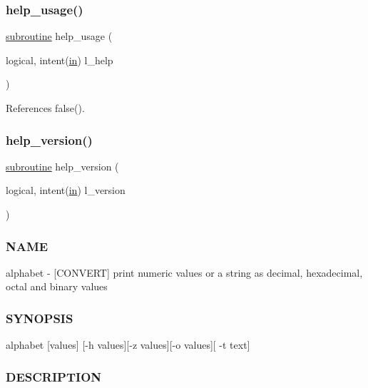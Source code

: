 \subsubsection{\texorpdfstring{help\+\_\+usage()}{help\_usage()}}
{\footnotesize\ttfamily \hyperlink{M__stopwatch_83_8txt_acfbcff50169d691ff02d4a123ed70482}{subroutine} help\+\_\+usage (\begin{DoxyParamCaption}\item[{logical, intent(\hyperlink{M__journal_83_8txt_afce72651d1eed785a2132bee863b2f38}{in})}]{l\+\_\+help }\end{DoxyParamCaption})}



References false().

\mbox{\label{alphabet_8f90_a39c21619b08a3c22f19e2306efd7f766}} 
\subsubsection{\texorpdfstring{help\+\_\+version()}{help\_version()}}
{\footnotesize\ttfamily \hyperlink{M__stopwatch_83_8txt_acfbcff50169d691ff02d4a123ed70482}{subroutine} help\+\_\+version (\begin{DoxyParamCaption}\item[{logical, intent(\hyperlink{M__journal_83_8txt_afce72651d1eed785a2132bee863b2f38}{in})}]{l\+\_\+version }\end{DoxyParamCaption})}



\subsubsection*{N\+A\+ME}

alphabet -\/ \mbox{[}C\+O\+N\+V\+E\+RT\mbox{]} print numeric values or a string as decimal, hexadecimal, octal and binary values \subsubsection*{S\+Y\+N\+O\+P\+S\+IS}

alphabet \mbox{[}values\mbox{]} \mbox{[}-\/h values\mbox{]}\mbox{[}-\/z values\mbox{]}\mbox{[}-\/o values\mbox{]}\mbox{[} -\/t text\mbox{]} \subsubsection*{D\+E\+S\+C\+R\+I\+P\+T\+I\+ON}

